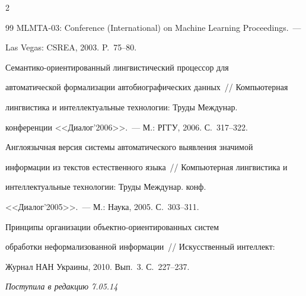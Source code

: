 \begin{multicols}{2}
{{\begin{thebibliography}{99}
MLMTA-03:  Conference (International) on Machine Learning Proceedings.~---


Las Vegas: CSREA, 2003. P.~75--80.






Се\-ман\-ти\-ко-ори\-ен\-тированный лингвистический процессор для


авто\-матической формализации автобиографических \mbox{данных}~// Компьютерная


лингвистика и интеллектуальные технологии: Труды Междунар.


конференции <<Диалог'2006>>.~--- М.: РГГУ, 2006. С.~317--322.






Англоязычная версия системы автоматического выявления значимой


информации из текстов естественного языка~// Компьютерная лингвистика и


интеллектуальные технологии: Труды Междунар. конф.


<<Диалог'2005>>.~--- М.: Наука, 2005. С.~303--311.






Принципы организации объ\-ект\-но-ори\-ен\-ти\-ро\-ван\-ных сис\-тем


обработки неформализованной информации~// Искусственный интеллект:


Журнал НАН Украины, 2010. Вып.~3. С.~227--237.





\end{thebibliography}





 }


 }





 \end{multicols}





 \vspace*{-6pt}





 \hfill{\small\textit{Поступила в редакцию 7.05.14}}





